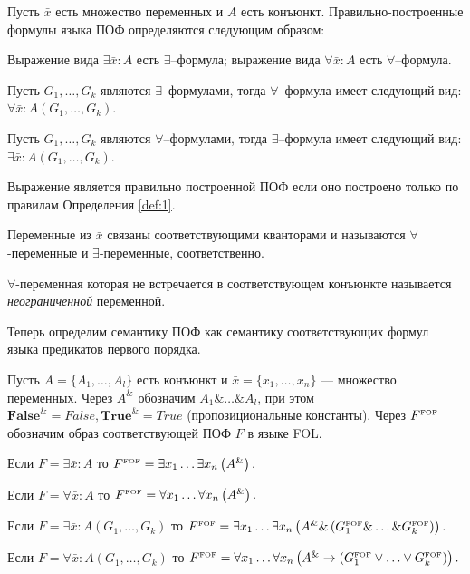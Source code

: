 \begin{definition}\label{def:1}
Пусть $\bar{x}$ есть множество переменных и $A$ есть конъюнкт. Правильно-построенные формулы языка ПОФ определяются следующим образом:

Выражение вида $\exists \bar{x}\colon A$ есть $\exists$--формула; выражение вида $\forall \bar{x}\colon A$ есть $\forall$--формула.

Пусть $G_1,\ldots,G_k$ являются $\exists$--формулами, тогда $\forall$--формула имеет следующий вид: $\forall \bar{x}\colon A\left(G_1,\ldots,G_k\right)$.

Пусть $G_1,\ldots,G_k$ являются $\forall$--формулами, тогда $\exists$--формула имеет следующий вид: $\exists \bar{x}\colon A\left(G_1,\ldots,G_k\right)$.

\end{definition}

Выражение является правильно построенной ПОФ если оно построено только по правилам Определения \ref{def:1}.

Переменные из $\bar{x}$ связаны соответствующими кванторами и называются $\forall$-переменные и $\exists$-переменные, соответственно.

$\forall$-переменная которая не встречается в соответствующем конъюнкте называется {\em неограниченной} переменной.

Теперь определим семантику ПОФ как семантику соответствующих формул языка предикатов первого порядка.

\begin{definition}\label{def:semantic}
Пусть $A = \{A_1,\ldots,A_l\}$ есть конъюнкт и $\bar{x} = \{x_1,\ldots,x_n\}$ --- множество переменных. Через $A^{\&}$ обозначим $A_1 \&\ldots\&A_l$, при этом $\boldsymbol{False}^{\&}= False, \boldsymbol{True}^{\&}=True$ (пропозициональные константы). Через $F^{\text{\tiny{FOF}}}$ обозначим образ соответствующей ПОФ $F$ в языке FOL.

Если $F= \exists \bar{x}\colon A$ то $F^{\text{\tiny{FOF}}} = \exists x_1 \ldots \exists x_n \left(A^{\&}\right).$

Если $F = \forall \bar{x}\colon A$ то $F^{\text{\tiny{FOF}}} = \forall x_1 \ldots \forall x_n \left(A^{\&}\right).$

Если $F = \exists \bar{x}\colon A\left(G_1,\ldots,G_k\right)$ то $F^{\text{\tiny{FOF}}} = \exists x_1 \ldots \exists x_n  \left(A^{\&} \& \left(G_{1}^{\text{\tiny{FOF}}} \& \ldots \& G_{k}^{\text{\tiny{FOF}}}\right)\right).$

Если $F = \forall \bar{x}\colon A\left(G_1,\ldots,G_k\right)$ то $F^{\text{\tiny{FOF}}} = \forall x_1 \ldots \forall x_n \left(A^{\&}\rightarrow \left(G_{1}^{\text{\tiny{FOF}}} \vee\ldots\vee G_{k}^{\text{\tiny{FOF}}}\right)\right).$

\end{definition}

